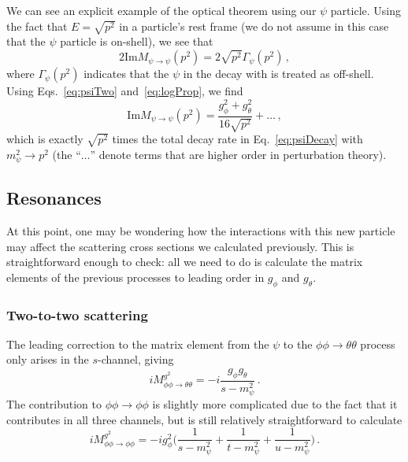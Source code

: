 \documentclass{article}
\numberwithin{equation}{subsection}
\begin{document}
We can see an explicit example of the optical theorem using our $\psi$ particle. Using the fact that $E = \sqrt{p^2}$ in a particle's rest frame (we
do not assume in this case that the $\psi$ particle is on-shell), we see that
\begin{equation}
 2\text{Im}M_{\psi\to\psi}(p^2) = 2\sqrt{p^2}\Gamma_\psi(p^2)\,,
\end{equation}
where $\Gamma_\psi(p^2)$ indicates that the $\psi$ in the decay with is treated as off-shell. Using Eqs.~\eqref{eq:psiTwo} and~\eqref{eq:logProp}, we find
\begin{equation}
 \text{Im}M_{\psi\to\psi}(p^2) = \frac{g_\phi^2 + g_\theta^2}{16\sqrt{p^2}} + \dots\,,
\end{equation}
which is exactly $\sqrt{p^2}$ times the total decay rate in Eq.~\eqref{eq:psiDecay} with $m_\psi^2\to p^2$ (the ``$\dots$'' denote terms that
are higher order in perturbation theory).

\subsection{Resonances}

At this point, one may be wondering how the interactions with this new particle may affect the scattering cross sections we calculated previously.
This is straightforward enough to check: all we need to do is calculate the matrix elements of the previous processes to leading order in $g_\phi$ and $g_\theta$.

\subsubsection{Two-to-two scattering}

The leading correction to the matrix element from the $\psi$ to the $\phi\phi\to\theta\theta$ process only arises in the $s$-channel, giving
\begin{equation}
 iM^{g^2}_{\phi\phi\to\theta\theta} = -i\frac{g_\phi g_\theta}{s - m_\psi^2}\,.
\end{equation}
The contribution to $\phi\phi\to\phi\phi$ is slightly more complicated due to the fact that it contributes in all three channels, but
is still relatively straightforward to calculate
\begin{equation}
 iM^{g^2}_{\phi\phi\to\phi\phi} = - i g_\phi^2\Bigg(\frac{1}{s - m_\psi^2} + \frac{1}{t - m_\psi^2} + \frac{1}{u - m_\psi^2}\Bigg)\,.
\end{equation}
\end{document}
